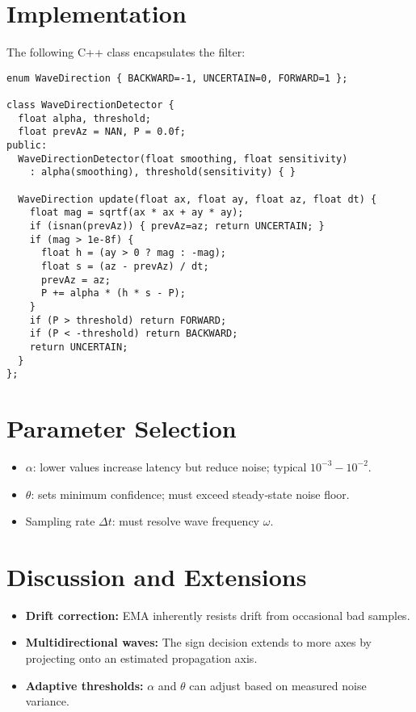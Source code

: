 \documentclass[11pt,letterpaper]{article}
\begin{document}
\section{Implementation}
The following C++ class encapsulates the filter:

\begin{verbatim}
enum WaveDirection { BACKWARD=-1, UNCERTAIN=0, FORWARD=1 };

class WaveDirectionDetector {
  float alpha, threshold;
  float prevAz = NAN, P = 0.0f;
public:
  WaveDirectionDetector(float smoothing, float sensitivity)
    : alpha(smoothing), threshold(sensitivity) { }

  WaveDirection update(float ax, float ay, float az, float dt) {
    float mag = sqrtf(ax * ax + ay * ay);
    if (isnan(prevAz)) { prevAz=az; return UNCERTAIN; }
    if (mag > 1e-8f) {
      float h = (ay > 0 ? mag : -mag);
      float s = (az - prevAz) / dt;
      prevAz = az;
      P += alpha * (h * s - P);
    }
    if (P > threshold) return FORWARD;
    if (P < -threshold) return BACKWARD;
    return UNCERTAIN;
  }
};
\end{verbatim}

\section{Parameter Selection}
\begin{itemize}
  \item \(\alpha\): lower values increase latency but reduce noise; typical \(10^{-3}\!-\!10^{-2}\).
  \item \(\theta\): sets minimum confidence; must exceed steady‐state noise floor.
  \item Sampling rate \(\Delta t\): must resolve wave frequency \(\omega\).
\end{itemize}

\section{Discussion and Extensions}
\begin{itemize}
  \item \textbf{Drift correction:} EMA inherently resists drift from occasional bad samples.
  \item \textbf{Multidirectional waves:} The sign decision extends to more axes by projecting onto an estimated propagation axis.
  \item \textbf{Adaptive thresholds:} \(\alpha\) and \(\theta\) can adjust based on measured noise variance.
\end{itemize}
\end{document}

